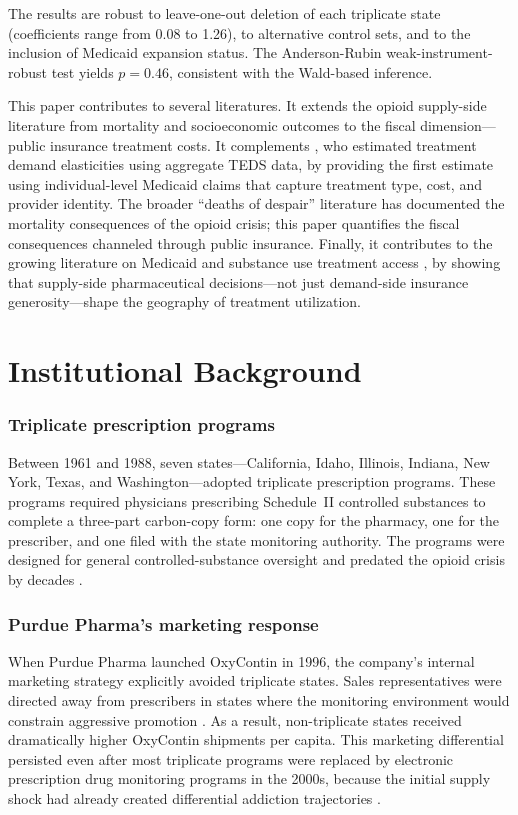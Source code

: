 \documentclass[12pt]{article}
\begin{document}
The results are robust to leave-one-out deletion of each triplicate state (coefficients range from 0.08 to 1.26), to alternative control sets, and to the inclusion of Medicaid expansion status. The Anderson-Rubin weak-instrument-robust test yields $p = 0.46$, consistent with the Wald-based inference.

This paper contributes to several literatures. It extends the opioid supply-side literature \citep{AlpertPowellPacula2022, Arteaga2023, EvanLieber2023, Schnell2022} from mortality and socioeconomic outcomes to the fiscal dimension---public insurance treatment costs. It complements \citet{PowellPaculaTaylor2020}, who estimated treatment demand elasticities using aggregate TEDS data, by providing the first estimate using individual-level Medicaid claims that capture treatment type, cost, and provider identity. The broader ``deaths of despair'' literature \citep{CaseDeaton2015, CaseDeaton2017, Ruhm2019} has documented the mortality consequences of the opioid crisis; this paper quantifies the fiscal consequences channeled through public insurance. Finally, it contributes to the growing literature on Medicaid and substance use treatment access \citep{MacleanSaloner2019, WenHockenberry2018}, by showing that supply-side pharmaceutical decisions---not just demand-side insurance generosity---shape the geography of treatment utilization.

\section{Institutional Background}

\subsubsection*{Triplicate prescription programs} Between 1961 and 1988, seven states---California, Idaho, Illinois, Indiana, New York, Texas, and Washington---adopted triplicate prescription programs. These programs required physicians prescribing Schedule~II controlled substances to complete a three-part carbon-copy form: one copy for the pharmacy, one for the prescriber, and one filed with the state monitoring authority. The programs were designed for general controlled-substance oversight and predated the opioid crisis by decades \citep{Fishman2004}.

\subsubsection*{Purdue Pharma's marketing response} When Purdue Pharma launched OxyContin in 1996, the company's internal marketing strategy explicitly avoided triplicate states. Sales representatives were directed away from prescribers in states where the monitoring environment would constrain aggressive promotion \citep{VanZee2009, AlpertPowellPacula2022}. As a result, non-triplicate states received dramatically higher OxyContin shipments per capita. This marketing differential persisted even after most triplicate programs were replaced by electronic prescription drug monitoring programs in the 2000s, because the initial supply shock had already created differential addiction trajectories \citep{AlpertPowellPacula2022}.
\end{document}
